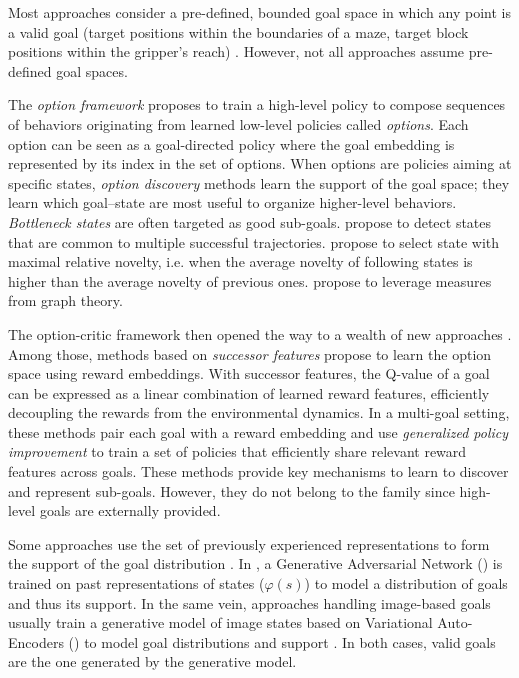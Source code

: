 Most approaches consider a pre-defined, bounded goal space in which any point is a valid goal (\eg target positions within the boundaries of a maze, target block positions within the gripper's reach) \cite{schaul2015universal,andrychowicz2017hindsight,nair2017overcoming,plappert2018multi,curious,blaes2019control,lanier2019curiosity,ding_imitation_2019,li2019towards}. However, not all approaches assume pre-defined goal spaces. 

The \textit{option framework} \cite{sutton_between_1999,precup_temporal_2000} proposes to train a high-level policy to compose sequences of behaviors originating from learned low-level policies called \textit{options}. Each option can be seen as a goal-directed policy where the goal embedding is represented by its index in the set of options. When options are policies aiming at specific states, \textit{option discovery} methods learn the support of the goal space; they learn which goal--state are most useful to organize higher-level behaviors. \textit{Bottleneck states} are often targeted as good sub-goals. \cite{mcgovern_automatic_2001} propose to detect states that are common to multiple successful trajectories. \cite{simsek_using_2004} propose to select state with maximal relative novelty, i.e. when the average novelty of following states is higher than the average novelty of previous ones. \cite{simsek_skill_2008} propose to leverage measures from graph theory.

The option-critic framework then opened the way to a wealth of new approaches \cite{bacon2017option}. Among those, methods based on \textit{successor features} \cite{NIPS2017_350db081,barreto2020fast,ramesh_successor_2019} propose to learn the option space using reward embeddings. With successor features, the Q-value of a goal can be expressed as a linear combination of learned reward features, efficiently decoupling the rewards from the environmental dynamics. In a multi-goal setting, these methods pair each goal with a reward embedding and use \textit{generalized policy improvement} to train a set of policies that efficiently share relevant reward features across goals. These methods provide key mechanisms to learn to discover and represent sub-goals. However, they do not belong to the \rlimgep family since high-level goals are externally provided.

Some approaches use the set of previously experienced representations to form the support of the goal distribution \cite{veeriah2018many,akakzia2020decstr,ecoffet2020first}. In \cite{goalgan}, a Generative Adversarial Network (\gan) is trained on past representations of states ($\varphi(s)$) to model a distribution of goals and thus its support. In the same vein, approaches handling image-based goals usually train a generative model of image states based on Variational Auto-Encoders (\vae) to model goal distributions and support \cite{nair2018visual,pong2019skew,nair2020contextual}. In both cases, valid goals are the one generated by the generative model.

